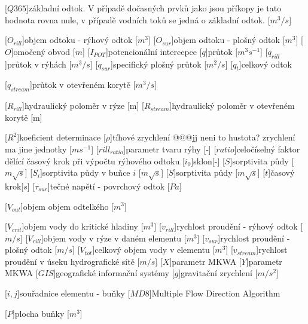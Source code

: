 \begin{acronym}
[$Q365$]{základní odtok. V případě dočasných prvků jako jsou příkopy je tato hodnota rovna nule, v případě vodních toků se jedná o základní odtok. [$m^3/s$]}

[$O_{rill}$]{objem odtoku - rýhový odtok [$m^{3}$]}
[$O_{sur}$]{objem odtoku - plošný odtok [$m^{3}$]}
[$O$]{omočený obvod [$m$]}
[$I_{POT}$]{potencionální intercepce}
[$q$]{průtok [$m^{3}{s}^{-1}$]}
[$q_{rill}$]{průtok v rýhách [$m^{3}/s$]}
[$q_{sur}$]{specifický plošný průtok [$m^{2}/s$]}
[$q_{t}$]{celkový odtok}

[$q_{stream}$]{průtok v otevřeném korytě [$m^{3}/s$]}

[$R_{rill}$]{hydraulický poloměr v rýze [m]}
[$R_{stream}$]{hydraulický poloměr v otevřeném korytě [m]}


[$R^2$]{koeficient determinace}
[$\rho$]{tíhové zrychlení @@@jj neni to hustota? zrychlení ma jine jednotky [$m s^{-1}$]}
[$rill_{ratio}$]{parametr tvaru rýhy [-]}
[$ratio$]{celočíselný faktor dělící časový krok při výpočtu rýhového odtoku}
[$i_{0}$]{sklon[-]}
[$S$]{sorptivita půdy [$m \sqrt{s}$]}
[$S_{i}$]{sorptivita půdy  v buňce $i$  [$m \sqrt{s}$]}
[$S$]{sorptivita půdy [$m \sqrt{s}$]}
[$t$]{časový krok[$s$]}
[$\tau_{sur}$]{tečné napětí - povrchový odtok [$Pa$]}

[$V_{out}$]{objem objem odtelkého [$m^{3}$]}

[$V_{crit}$]{objem vody do kritické hladiny [$m^{3}$]}
[$v_{rill}$]{rychlost proudění - rýhový odtok [$m/s$]}
[$V_{rill}$]{objem vody v rýze v daném elementu [$m^{3}$]}
[$v_{sur}$]{rychlost proudění - plošný odtok [$m/s$]}
[$V_{tot}$]{celkový objem vody v elementu [$m^{3}$]}
[$v_{stream}$]{rychlost proudění v úseku hydrografické sítě [$m/s$]}
[$X$]{parametr MKWA}
[$Y$]{parametr MKWA}
[$GIS$]{geografické informační systémy}
[$g$]{gravitační zrychlení [$m/s^{2}$]}

[$i, j$]{souřadnice elementu - buňky}
[$MD8$]{Multiple Flow Direction Algorithm}

[$P$]{plocha buňky [$m^3$]}



\end{acronym}
